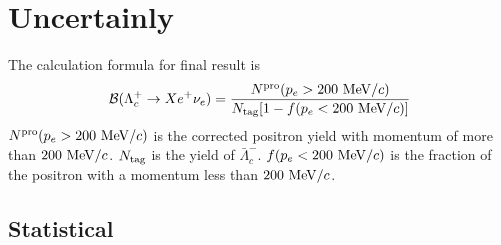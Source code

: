 \documentclass{beamer}
\begin{document}
\section{Uncertainly}
\begin{frame}
    The calculation formula for final result is
    \[\mathcal{B}(\Lambda_c^+ \rightarrow X e^+ \nu_e)=\frac{N^{\rm pro}(p_e>200~{\rm MeV}/c)}{N_{\rm tag}[1-f(p_e<200~{\rm MeV}/c)]}\]
    $N^{\rm pro}(p_e>200~{\rm MeV}/c)$ is the corrected positron yield with momentum of more than $200~{\rm MeV}/c$. $N_{\rm tag}$ is the yield of $\bar{\Lambda}_c^-$. $f(p_e<200~{\rm MeV}/c)$ is the fraction of
    the positron with a momentum less than $200~{\rm MeV}/c$.
\end{frame}
\subsection{Statistical}
\end{document}
